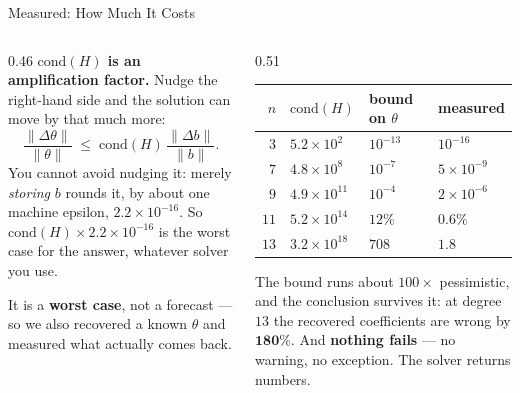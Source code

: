 \begin{frame}{Measured: How Much It Costs}
\begin{columns}[T]
\begin{column}{0.46\textwidth}
\small
\textbf{$\mathrm{cond}(H)$ is an amplification factor.} Nudge the right-hand side and the solution
can move by that much more:
\[
  \frac{\|\Delta\theta\|}{\|\theta\|}\;\le\;\mathrm{cond}(H)\,\frac{\|\Delta b\|}{\|b\|} .
\]
You cannot avoid nudging it: merely \emph{storing} $b$ rounds it, by about one machine epsilon,
$2.2\times10^{-16}$. So $\mathrm{cond}(H)\times2.2\times10^{-16}$ is the worst case for the answer,
whatever solver you use.
\medskip

It is a \textbf{worst case}, not a forecast --- so we also recovered a known $\theta$ and measured
what actually comes back.
\end{column}
\begin{column}{0.51\textwidth}
\begin{center}\footnotesize
\begin{tabularx}{\linewidth}{@{}r >{\raggedleft\arraybackslash}X >{\raggedleft\arraybackslash}p{1.35cm} >{\raggedleft\arraybackslash}p{1.35cm}@{}}
\toprule
$n$ & $\mathrm{cond}(H)$ & bound on $\theta$ & measured \\
\midrule
$3$ & $5.2\times10^{2}$ & $10^{-13}$ & $10^{-16}$ \\
$7$ & $4.8\times10^{8}$ & $10^{-7}$ & $5\times10^{-9}$ \\
$9$ & $4.9\times10^{11}$ & $10^{-4}$ & $2\times10^{-6}$ \\
$11$ & $5.2\times10^{14}$ & $12\%$ & $\mathbf{0.6\%}$ \\
$13$ & $3.2\times10^{18}$ & $708$ & $\mathbf{1.8}$ \\
\bottomrule
\end{tabularx}
\end{center}
\medskip
\begin{cautionbox}\footnotesize
The bound runs about $100\times$ pessimistic, and the conclusion survives it: at degree $13$ the
recovered coefficients are wrong by $\mathbf{180\%}$. And \textbf{nothing fails} --- no warning, no
exception. The solver returns numbers.
\end{cautionbox}
\end{column}
\end{columns}
\vspace{1mm}
\end{frame}

